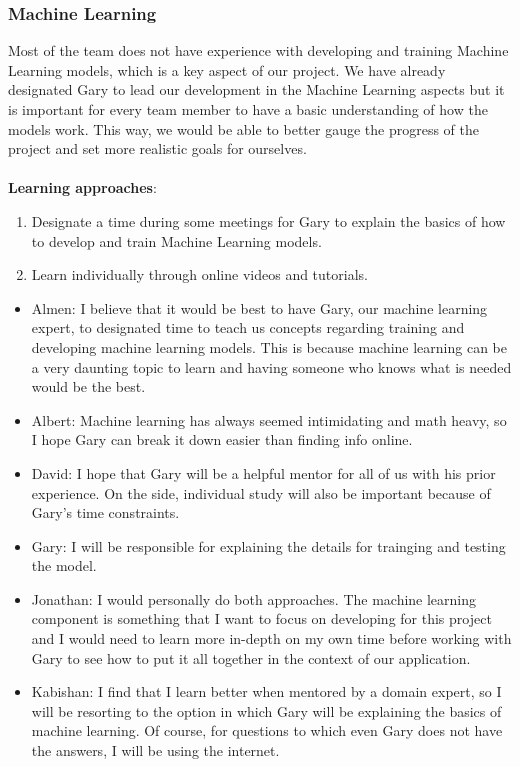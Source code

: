 \documentclass[12pt,letterpaper]{article}
\newcommand{\term}[2][]{\ifthenelse{\equal{#1}{}}{\hyperref[Term:#2]{\textbf{#2}}}{\hyperref[Term:#1]{\textbf{#2}}}}
\begin{document}
\subsubsection{Machine Learning}
Most of the team does not have experience with developing and training Machine
Learning models, which is a key aspect of our project. We have already
designated Gary to lead our development in the Machine Learning aspects but it
is important for every team member to have a basic understanding of how the
models work. This way, we would be able to better gauge the progress of the
project and set more realistic goals for ourselves. \\
\\
\noindent \textbf{Learning approaches}:
\begin{enumerate}
    \item Designate a time during some meetings for Gary to explain the basics
    of how to develop and train Machine Learning models.
    \item Learn individually through online videos and tutorials.
\end{enumerate}

\begin{itemize}
    \item Almen: I believe that it would be best to have Gary, our machine
    learning expert, to designated time to teach us concepts regarding training
    and developing machine learning models. This is because machine learning can
    be a very daunting topic to learn and having someone who knows what is
    needed would be the best.
    \item Albert: Machine learning has always seemed intimidating and math
    heavy, so I hope Gary can break it down easier than finding info online.
    \item David: I hope that Gary will be a helpful mentor for all of us with
    his prior \term{ML} experience. On the side, individual study will also be
    important because of Gary's time constraints.
    \item Gary: I will be responsible for explaining the details for trainging
    and testing the \term{ML} model.
    \item Jonathan: I would personally do both approaches. The machine learning
    component is something that I want to focus on developing for this project
    and I would need to learn more in-depth on my own time before working with
    Gary to see how to put it all together in the context of our application.
    \item Kabishan: I find that I learn better when mentored by a domain expert,
    so I will be resorting to the option in which Gary will be explaining the
    basics of machine learning. Of course, for questions to which even Gary does
    not have the answers, I will be using the internet.
\end{itemize}
\end{document}
